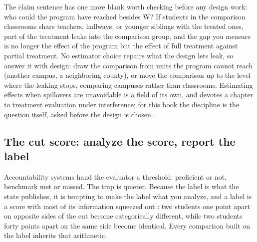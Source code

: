 \documentclass[
    a4paper,
    fontsize=10pt,
    twoside=true,
    numbers=noenddot,
]{kaobook}
\begin{document}
The claim sentence has one more blank worth checking before any design work: who could the program have reached besides W? If students in the comparison classrooms share teachers, hallways, or younger siblings with the treated ones, part of the treatment leaks into the comparison group, and the gap you measure is no longer the effect of the program but the effect of full treatment against partial treatment. No estimator choice repairs what the design lets leak, so answer it with design: draw the comparison from units the program cannot reach (another campus, a neighboring county), or move the comparison up to the level where the leaking stops, comparing campuses rather than classrooms. Estimating effects when spillovers are unavoidable is a field of its own, and \textcite{huber2023causal} devotes a chapter to treatment evaluation under interference; for this book the discipline is the question itself, asked before the design is chosen.

\subsection{The cut score: analyze the score, report the label}\label{ch08-sc-cutscore}
Accountability systems hand the evaluator a threshold: proficient or not, benchmark met or missed. The trap is quieter. Because the label is what the state publishes, it is tempting to make the label what you analyze, and a label is a score with most of its information squeezed out \parencite{osborne2013cleaning}: two students one point apart on opposite sides of the cut become categorically different, while two students forty points apart on the same side become identical. Every comparison built on the label inherits that arithmetic.
\end{document}
